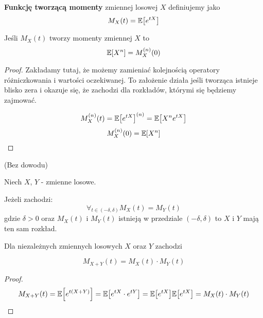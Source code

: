 \begin{definition}
	\textbf{Funkcję tworzącą momenty} zmiennej losowej \( X \) definiujemy jako
	\[
		M_X(t) = \expected{e^{tX}}
	\]
\end{definition}

\begin{theorem}[Twierdzenie 4.1  P\&C]
	Jeśli \( M_X(t) \) tworzy momenty zmiennej \( X \) to
	\[
		\expected{X^n} = M_X^{(n)}(0)
	\]
\end{theorem}
\begin{proof}
	Zakładamy tutaj, że możemy zamieniać kolejnością operatory różniczkowania i wartości oczekiwanej.
	To założenie działa jeśli tworząca istnieje blisko zera i okazuje się, że zachodzi dla rozkładów, którymi się będziemy zajmować.

	\[
		M_X^{(n)}(t) = \expected{e^{tX}}^{(n)}
		= \expected{X^n e^{tX}}
	\]
	\[
		M_X^{(n)}(0) = \expected{X^n}
	\]
\end{proof}

\begin{theorem}
    (Bez dowodu)

    Niech \( X \), \( Y \) - zmienne losowe.

    Jeżeli zachodzi: 
    \[ 
        \forall_{t \in ( -\delta, \delta )} M_X(t) = M_Y(t) 
    \]
    gdzie \( \delta > 0 \) oraz \( M_X(t) \) i \( M_Y(t) \) istnieją w przedziale \( ( -\delta, \delta ) \) to \( X \) i \( Y \) mają ten sam rozkład.
\end{theorem}

\begin{theorem}[Twierdzenie 4.3 P\&C]
	Dla niezależnych zmiennych losowych \( X \) oraz \( Y \) zachodzi

	\[
		M_{X + Y}(t) = M_X(t) \cdot M_Y(t)
	\]
\end{theorem}
\begin{proof}
	\[
		M_{X + Y}(t) = \expected{e^{t(X + Y)}} = \expected{e^{tX}\cdot e^{tY}} = \expected{e^{tX}}\expected{e^{tX}} = M_X(t) \cdot M_Y(t)
	\]
\end{proof}
